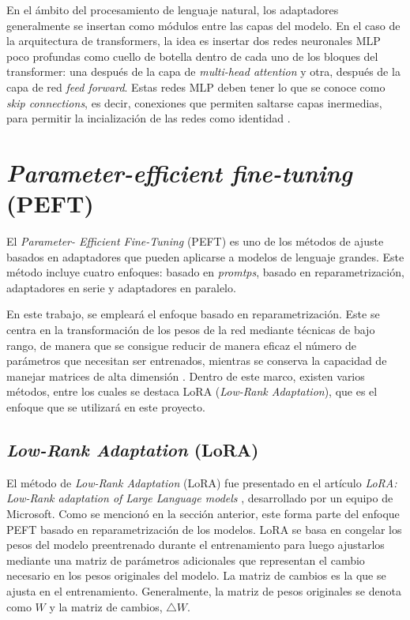 \documentclass[11pt,spanish,listoffigures,listoftables]{tfgetsinf}
\begin{document}
En el ámbito del procesamiento de lenguaje natural, los adaptadores generalmente se insertan como módulos entre las capas del modelo. En el caso de la arquitectura de transformers, la idea es insertar dos redes neuronales MLP poco profundas como cuello de botella dentro de cada uno de los bloques del transformer: una después de la capa de \textit{multi-head attention} y otra, después de la capa de red \textit{feed forward}. Estas redes MLP deben tener lo que se conoce como \textit{skip connections}, es decir, conexiones que permiten saltarse capas inermedias, para permitir la incialización de las redes como identidad \cite{murphy2022probabilistic}.


\section{\textit{Parameter-efficient fine-tuning} (PEFT)}

El \textit{Parameter- Efficient Fine-Tuning} (PEFT) es uno de los métodos de ajuste basados en adaptadores que pueden aplicarse a modelos de lenguaje grandes. Este método incluye cuatro enfoques: basado en \textit{promtps}, basado en reparametrización, adaptadores en serie y adaptadores en paralelo.

En este trabajo, se empleará el enfoque basado en reparametrización. Este se centra en la transformación de los pesos de la red mediante técnicas de bajo rango, de manera que se consigue reducir de manera eficaz el número de parámetros que necesitan ser entrenados, mientras se conserva la capacidad de manejar matrices de alta dimensión \cite{hu2023llmadaptersadapterfamilyparameterefficient}. Dentro de este marco, existen varios métodos, entre los cuales se destaca LoRA (\textit{Low-Rank Adaptation}), que es el enfoque que se utilizará en este proyecto.

\subsection{\textit{Low-Rank Adaptation} (LoRA)} \label{lora}

El método de \textit{Low-Rank Adaptation} (LoRA) fue presentado en el artículo \textit{LoRA: Low-Rank adaptation of Large Language models} \cite{hu2021loralowrankadaptationlarge}, desarrollado por un equipo de Microsoft. Como se mencionó en la sección anterior, este forma parte del enfoque PEFT basado en reparametrización de los modelos. LoRA se basa en congelar los pesos del modelo preentrenado durante el entrenamiento para luego ajustarlos mediante una matriz de parámetros adicionales que representan el cambio necesario en los pesos originales del modelo. La matriz de cambios es la que se ajusta en el entrenamiento. Generalmente, la matriz de pesos originales se denota como $W$ y la matriz de cambios, $\bigtriangleup W$.
\end{document}
